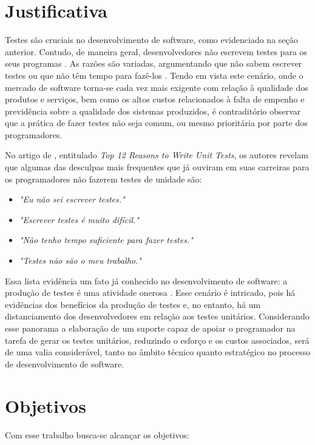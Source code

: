  \section{Justificativa}
  Testes são cruciais no desenvolvimento de software, como evidenciado na seção anterior. Contudo, de maneira geral, desenvolvedores não escrevem testes para os seus programas \cite{burke_coyner_2003}. As razões são variadas, argumentando que não sabem escrever testes ou que não têm tempo para fazê-los \cite{burke_coyner_2003}. Tendo em vista este cenário, onde o mercado de software torna-se cada vez mais exigente com relação à qualidade dos produtos e serviços, bem como os altos custos relacionados à falta de empenho e previdência sobre a qualidade dos sistemas produzidos, é contraditório observar que a prática de fazer testes não seja comum, ou mesmo prioritária por parte dos programadores.
  \par
  \indent No artigo de , entitulado \textit{Top 12 Reasons to Write Unit Tests}, os autores revelam que algumas das desculpas mais frequentes que já ouviram em suas carreiras para os programadores não fazerem testes de unidade são:
  \begin{itemize}
    \item \textit{"Eu não sei escrever testes."}
    \item \textit{"Escrever testes é muito difícil."}
    \item \textit{"Não tenho tempo suficiente para fazer testes."}
    \item \textit{"Testes não são o meu trabalho."}
  \end{itemize}
  \par
  \indent Essa lista evidência um fato já conhecido no desenvolvimento de software: a produção de testes é uma atividade onerosa \cite{barbosa_et_al_2009}. Esse cenário é intricado, pois há evidências dos benefícios da produção de testes e, no entanto, há um distanciamento dos desenvolvedores em relação aos testes unitários. Considerando esse panorama a elaboração de um suporte capaz de apoiar o programador na tarefa de gerar os testes unitários, reduzindo o esforço e os custos associados, será de uma valia considerável, tanto no âmbito técnico quanto estratégico no processo de desenvolvimento de software.
 
  \section{Objetivos}
  Com esse trabalho busca-se alcançar os objetivos:
